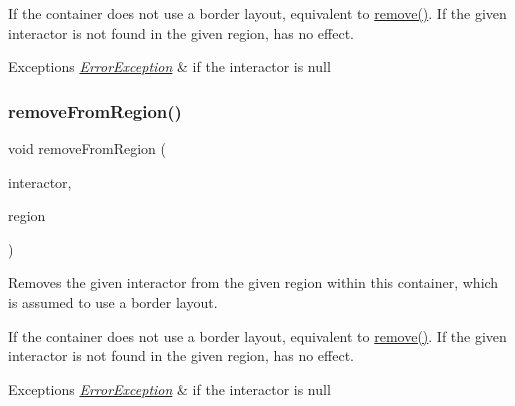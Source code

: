 If the container does not use a border layout, equivalent to \mbox{\hyperlink{classGContainer_a1c12b1fde5c2ef10d79d4ee51e670efa}{remove()}}. If the given interactor is not found in the given region, has no effect. 
\begin{DoxyExceptions}{Exceptions}
{\em \mbox{\hyperlink{classErrorException}{Error\+Exception}}} & if the interactor is null \\
\hline
\end{DoxyExceptions}
\mbox{\label{classGContainer_a16268c8344a5a5d9b10bde95764112d1}} 
\subsubsection{\texorpdfstring{remove\+From\+Region()}{removeFromRegion()}\hspace{0.1cm}{\footnotesize\ttfamily [2/6]}}
{\footnotesize\ttfamily void remove\+From\+Region (\begin{DoxyParamCaption}\item[{\mbox{\hyperlink{classGInteractor}{G\+Interactor}} $\ast$}]{interactor,  }\item[{const std\+::string \&}]{region }\end{DoxyParamCaption})\hspace{0.3cm}{\ttfamily [virtual]}}



Removes the given interactor from the given region within this container, which is assumed to use a border layout. 

If the container does not use a border layout, equivalent to \mbox{\hyperlink{classGContainer_a1c12b1fde5c2ef10d79d4ee51e670efa}{remove()}}. If the given interactor is not found in the given region, has no effect. 
\begin{DoxyExceptions}{Exceptions}
{\em \mbox{\hyperlink{classErrorException}{Error\+Exception}}} & if the interactor is null \\
\hline
\end{DoxyExceptions}
\mbox{\label{classGContainer_afee7b65f917c4f6a0fdb1c8ea75406a5}} 

